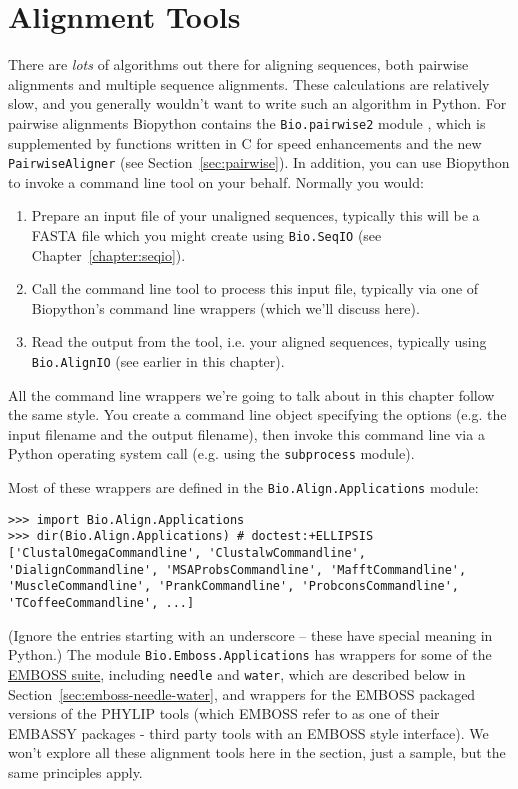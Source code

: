 \section{Alignment Tools}
\label{sec:alignment-tools}

There are \emph{lots} of algorithms out there for aligning sequences, both pairwise alignments
and multiple sequence alignments. These calculations are relatively slow, and you generally
wouldn't want to write such an algorithm in Python. For pairwise alignments Biopython contains
the \verb|Bio.pairwise2| module , which is supplemented by functions written in C for speed
enhancements and the new \verb|PairwiseAligner| (see Section~\ref{sec:pairwise}). In addition,
you can use Biopython to invoke a command line tool on your behalf. Normally you would:
\begin{enumerate}
\item Prepare an input file of your unaligned sequences, typically this will be a FASTA file
      which you might create using \verb|Bio.SeqIO| (see Chapter~\ref{chapter:seqio}).
\item Call the command line tool to process this input file, typically via one of Biopython's
      command line wrappers (which we'll discuss here).
\item Read the output from the tool, i.e. your aligned sequences, typically using
      \verb|Bio.AlignIO| (see earlier in this chapter).
\end{enumerate}

All the command line wrappers we're going to talk about in this chapter follow the same style.
You create a command line object specifying the options (e.g. the input filename and the
output filename), then invoke this command line via a Python operating system call (e.g.
using the \texttt{subprocess} module).

Most of these wrappers are defined in the \verb|Bio.Align.Applications| module:

\begin{verbatim}
>>> import Bio.Align.Applications
>>> dir(Bio.Align.Applications) # doctest:+ELLIPSIS
['ClustalOmegaCommandline', 'ClustalwCommandline', 'DialignCommandline', 'MSAProbsCommandline', 'MafftCommandline', 'MuscleCommandline', 'PrankCommandline', 'ProbconsCommandline', 'TCoffeeCommandline', ...]
\end{verbatim}

\noindent (Ignore the entries starting with an underscore -- these have
special meaning in Python.)
The module \verb|Bio.Emboss.Applications| has wrappers for some of the
\href{http://emboss.sourceforge.net/}{EMBOSS suite}, including
\texttt{needle} and \texttt{water}, which are described below in
Section~\ref{sec:emboss-needle-water}, and wrappers for the EMBOSS
packaged versions of the PHYLIP tools (which EMBOSS refer to as one
of their EMBASSY packages - third party tools with an EMBOSS style
interface).
We won't explore all these alignment tools here in the section, just a
sample, but the same principles apply.

